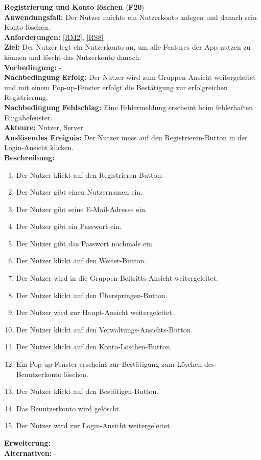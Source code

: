 \documentclass[parskip=full]{scrartcl}
\begin{document}
\textbf{Registrierung und Konto löschen $\langle$F20$\rangle$}\\
\textbf{Anwendungsfall:} Der Nutzer möchte ein Nutzerkonto anlegen und danach sein Konto löschen.\\
\textbf{Anforderungen:} \ref{RM2}, \ref{RS8} \\
\textbf{Ziel:} Der Nutzer legt ein Nutzerkonto an, um alle Features der App nutzen zu können und löscht das Nutzerkonto danach.\\
\textbf{Vorbedingung:} -\\
\textbf{Nachbedingung Erfolg:} Der Nutzer wird zum Gruppen-Ansicht weitergeleitet und mit einem Pop-up-Fenster erfolgt die Bestätigung zur erfolgreichen Registrierung.\\
\textbf{Nachbedingung Fehlschlag:} Eine Fehlermeldung erscheint beim fehlerhaften Eingabefenster.\\
\textbf{Akteure:} Nutzer, Server\\
\textbf{Auslösendes Ereignis:} Der Nutzer muss auf den Registrieren-Button in der Login-Ansicht klicken.\\
\textbf{Beschreibung:}
\begin{enumerate}
    \item Der Nutzer klickt auf den Registrieren-Button.
    \item Der Nutzer gibt einen Nutzernamen ein.
    \item Der Nutzer gibt seine E-Mail-Adresse ein.
    \item Der Nutzer gibt ein Passwort ein.
    \item Der Nutzer gibt das Passwort nochmals ein.
    \item Der Nutzer klickt auf den Weiter-Button.
    \item Der Nutzer wird in die Gruppen-Beitritts-Ansicht weitergeleitet.
    \item Der Nutzer klickt auf den Überspringen-Button.
    \item Der Nutzer wird zur Haupt-Ansicht weitergeleitet.
    \item Der Nutzer klickt auf den Verwaltungs-Ansichts-Button.
    \item Der Nutzer klickt auf den Konto-Löschen-Button.
    \item Ein Pop-up-Fenster erscheint zur Bestätigung zum Löschen des Benutzerkonto löschen.
    \item Der Nutzer klickt auf den Bestätigen-Button.
    \item Das Benutzerkonto wird gelöscht.
    \item Der Nutzer wird zur Login-Ansicht weitergeleitet.
\end{enumerate}
\textbf{Erweiterung:} -\\
\textbf{Alternativen:} -\\
\newpage
\end{document}
